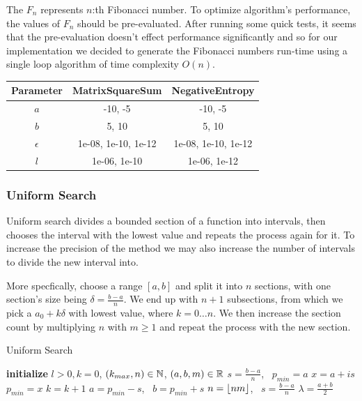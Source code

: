 \documentclass[a4paper,english,titlepage,12pt]{article}
\newcommand{\floor}[1]{\ensuremath\lfloor#1\rfloor}
\newcommand{\R}{\ensuremath\mathbb{R}}
\newcommand{\N}{\ensuremath\mathbb{N}}
\begin{document}
The $F_n$ represents $n$:th Fibonacci number. To optimize algorithm's performance, the values of $F_n$ should be pre-evaluated. After running some quick tests, it seems that the pre-evaluation doesn't effect performance significantly and so for our implementation we decided to generate the Fibonacci numbers run-time using a single loop algorithm of time complexity $O(n)$. 

\begin{table}[H]
\label{tab:params_FibonacciSearch}
\centering
{}
\begin{tabular}{|c|c|c|}
\hline
\rowcolor{gray!25}
Parameter & MatrixSquareSum & NegativeEntropy \\
\hline
$a$ & -10, -5 & -10, -5 \\
$b$ & 5, 10 & 5, 10 \\
$\epsilon$ & 1e-08, 1e-10, 1e-12 & 1e-08, 1e-10, 1e-12 \\
$l$ & 1e-06, 1e-10 & 1e-06, 1e-12 \\
\hline
\end{tabular}
\end{table}


\subsubsection{Uniform Search}

Uniform search divides a bounded section of a function into intervals, then chooses the interval with the lowest value and repeats the process again for it. To increase the precision of the method we may also increase the number of intervals to divide the new interval into. \cite{book:nonlinear_programming}

More specfically, choose a range $[a, b]$ and split it into $n$ sections, with one section's size being $\delta = \frac{b - a}{n}$. We end up with $n + 1$ subsections, from which we pick a $a_0 + k \delta$ with lowest value, where $k = 0 \dots n$. We then increase the section count by multiplying $n$ with $m \geq 1$ and repeat the process with the new section. \cite{course_material_nonlinear_optimisation}


\begin{algorithm}[H]
\caption{Uniform Search}
\label{alg_uniform}
\begin{algorithmic}[1]
\STATE \textbf{initialize} $l > 0, k = 0$, $(k_{max}, n) \in \N$, $(a, b, m) \in \R$
\STATE $s = \frac{b - a}{n}$, \ $p_{min} = a$
        \STATE $x = a + i s$
            \STATE $p_{min} = x$
        \ENDIF
        \STATE $k = k + 1$
    \ENDFOR
    \STATE $a = p_{min} - s$, \ $b = p_{min} + s$
    \STATE $n = \floor{n m}$, \ $s = \frac{b - a}{n}$
\ENDWHILE
\RETURN $\lambda = \frac{a + b}{2}$
\end{algorithmic}
\end{algorithm}
\end{document}
